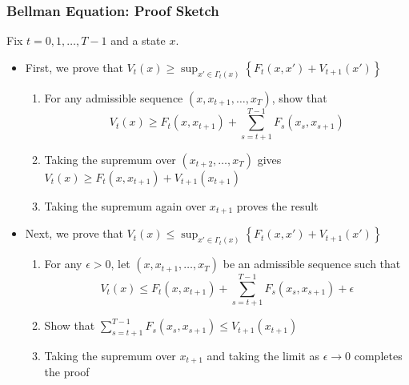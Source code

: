 \documentclass[9pt,aspectratio=169]{beamer}
\begin{document}
\begin{frame}
    \frametitle{Bellman Equation: Proof Sketch}
    Fix $t=0,1,\ldots,T-1$ and a state $x$.
    \begin{itemize}
        \item First, we prove that $V_t(x) \geq \sup_{x' \in \Gamma_t(x)}
        \left\{ F_t(x, x') + V_{t+1}(x')\right\}$
        \begin{enumerate}
            \item For any admissible sequence $(x, x_{t+1}, \ldots, x_T)$,
            show that
            \begin{equation*}
                V_t(x) \geq F_t(x, x_{t+1}) + \sum_{s=t+1}^{T-1} F_s(x_s, x_{s+1})
            \end{equation*}
            \item Taking the supremum over $(x_{t+2}, \ldots, x_T)$ gives
            $V_t(x) \geq F_t(x, x_{t+1}) + V_{t+1}(x_{t+1})$
            \item Taking the supremum again over $x_{t+1}$ proves the result
        \end{enumerate}
        \item Next, we prove that $V_t(x) \leq \sup_{x' \in \Gamma_t(x)}
        \left\{ F_t(x, x') + V_{t+1}(x')\right\}$
        \begin{enumerate}
            \item For any $\epsilon > 0$, let $(x, x_{t+1}, \ldots, x_T)$
            be an admissible sequence such that
            \begin{equation*}
                V_t(x) \leq F_t(x, x_{t+1}) + \sum_{s=t+1}^{T-1} F_s(x_s,
                x_{s+1}) + \epsilon
            \end{equation*}
            \item Show that $\sum_{s=t+1}^{T-1} F_s(x_s, x_{s+1}) \leq
            V_{t+1}(x_{t+1})$
            \item Taking the supremum over $x_{t+1}$ and taking the limit as
            $\epsilon \to 0$ completes the proof
        \end{enumerate}
    \end{itemize}
\end{frame}
\end{document}
